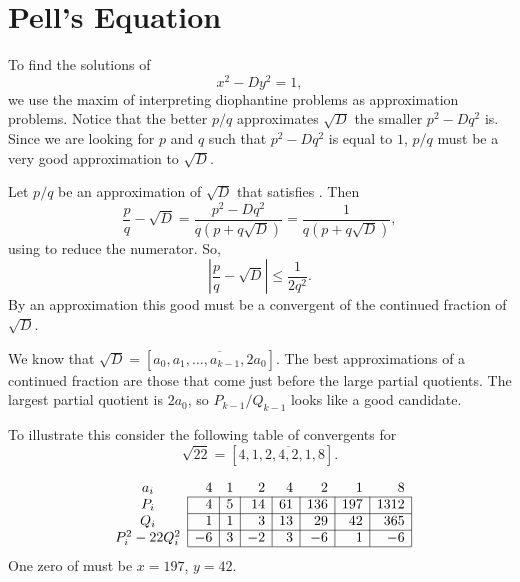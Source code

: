
\section{Pell's Equation}
\label{Pell:Equation:Sec}

To find the solutions of
\begin{equation}\label{Dio:Pell:Eq}
x^2 - D y^2 = 1,
\end{equation}
we use the maxim of interpreting diophantine problems as approximation
problems.  Notice that the better $p/q$ approximates $\sqrt{D}$ the
smaller $p^2 - Dq^2$ is.  Since we are looking for $p$ and $q$ such
that $p^2 -Dq^2$ is equal to $1$, $p/q$ must be a very good
approximation to $\sqrt{D}$.

Let $p/q$ be an approximation of $\sqrt{D}$ that satisfies
.  Then
\[
\frac{p}{q} - \sqrt{D} = \frac{p^2 - D q^2}{q(p+q \sqrt{D})} 
  = \frac{1}{q(p+q\sqrt{D})},
\]
using  to reduce the numerator.  So,
\[
\left| \frac{p}{q} - \sqrt{D}\right| \le \frac{1}{2q^2}.
\]
By  an approximation this good must be a
convergent of the continued fraction of $\sqrt{D}$. 

We know that $\sqrt{D} = [a_0, \overline{a_1, \ldots, a_{k-1},
2a_0}]$.  The best approximations of a continued fraction are those
that come just before the large partial quotients.  The largest
partial quotient is $2a_0$, so $P_{k-1}/Q_{k-1}$ looks like a good
candidate.

To illustrate this consider the following table of convergents for
\[
\sqrt{22} = [4, \overline{1, 2, 4, 2, 1, 8}].
\]

\[
\def\mR#1{\multicolumn{1}{r}{#1}}
\def\mC#1{\multicolumn{1}{c}{#1}}
\begin{array}{c|r|r|r|r|r|r|r|}
\mC{a_i}         & \mR4 & \mR1& \mR2 & \mR4 & \mR2 & \mR1 & \mR8 \\ \cline{2-8}
P_i              &  4 & 5 & 14 & 61 & 136 & 197 & 1312 \\ \cline{2-8}
Q_i              &  1 & 1 &  3 & 13 &  29 &  42 &  365 \\ \cline{2-8}
P_i^2 - 22 Q_i^2 & -6 & 3 & -2 &  3 &  -6 &   1 &   -6 \\ \cline{2-8}
\end{array} 
\]
One zero of  must be $x = 197$, $y = 42$.

